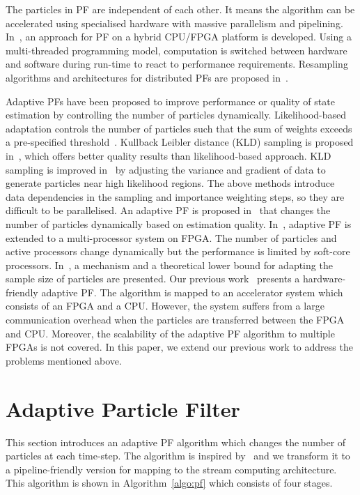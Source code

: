 The particles in PF are independent of each other.
It means the algorithm can be accelerated using specialised hardware with massive parallelism and pipelining.
In~\cite{happe11}, an approach for PF on a hybrid CPU/FPGA platform is developed.
Using a multi-threaded programming model, computation is switched between hardware and software during run-time to react to performance requirements. 
Resampling algorithms and architectures for distributed PFs are proposed in~\cite{bolic05}.

Adaptive PFs have been proposed to improve performance or quality of state estimation by controlling the number of particles dynamically. 
Likelihood-based adaptation controls the number of particles such that the sum of weights exceeds a pre-specified threshold~\cite{koller98}.
Kullback Leibler distance (KLD) sampling is proposed in~\cite{fox03}, which offers better quality results than likelihood-based approach. 
KLD sampling is improved in~\cite{park10} by adjusting the variance and gradient of data to generate particles near high likelihood regions. 
The above methods introduce data dependencies in the sampling and importance weighting steps, so they are difficult to be parallelised. 
An adaptive PF is proposed in~\cite{bolic02} that changes the number of particles dynamically based on estimation quality. 
In~\cite{chau12}, adaptive PF is extended to a multi-processor system on FPGA.
The number of particles and active processors change dynamically but the performance is limited by soft-core processors.
In~\cite{liu07}, a mechanism and a theoretical lower bound for adapting the sample size of particles are presented.
Our previous work~\cite{chau13a} presents a hardware-friendly adaptive PF. 
The algorithm is mapped to an accelerator system which consists of an FPGA and a CPU.
However, the system suffers from a large communication overhead when the particles are transferred between the FPGA and CPU.
Moreover, the scalability of the adaptive PF algorithm to multiple FPGAs is not covered.
In this paper, we extend our previous work to address the problems mentioned above.

\section{Adaptive Particle Filter}
\label{sec:apf}

This section introduces an adaptive PF algorithm which changes the number of particles at each time-step.
The algorithm is inspired by~\cite{liu07} and we transform it to a pipeline-friendly version for mapping to the stream computing architecture.
This algorithm is shown in Algorithm~\ref{algo:pf} which consists of four stages.

